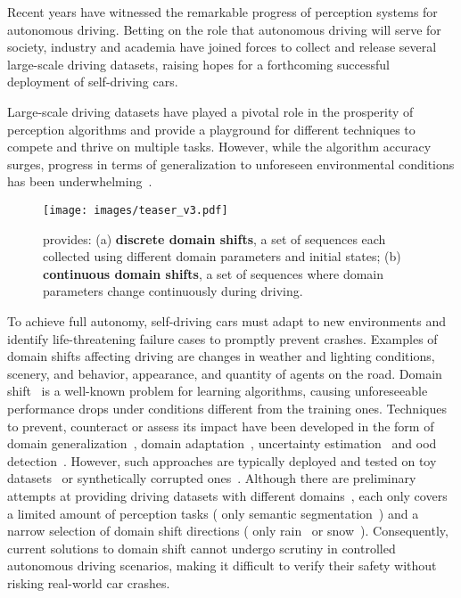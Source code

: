 Recent years have witnessed the remarkable progress of perception systems for autonomous driving.
Betting on the role that autonomous driving will serve for society,
industry
and academia have joined forces to collect and release several large-scale driving datasets, raising hopes for a forthcoming successful deployment of self-driving cars.

Large-scale driving datasets have 
played a pivotal role in the prosperity of perception algorithms and provide a playground for different techniques to compete and thrive on multiple tasks.
However, while the algorithm accuracy surges, progress in terms of generalization to unforeseen environmental conditions has been underwhelming~\cite{dai2018dark,michaelis2019benchmarking}.

\begin{figure}[!t]
    \centering
    \texttt{[image: images/teaser\_v3.pdf]}
    \caption{\thedataset{} provides: (a) \textbf{discrete domain shifts}, a set of sequences each collected using different domain parameters and initial states;
    (b) \textbf{continuous domain shifts}, a set of sequences where domain parameters change continuously during driving.
    \label{fig:teaser}}
\end{figure}
To achieve full autonomy, self-driving cars must adapt to new environments and identify life-threatening failure cases to promptly prevent crashes.
Examples of domain shifts affecting driving are changes in weather and lighting conditions, scenery, and behavior, appearance, and quantity of agents
on the road.
Domain shift~\cite{ben2010theory} is a well-known problem for learning algorithms, causing unforeseeable performance drops under conditions different from the training ones. 
Techniques to prevent, counteract or assess its impact have been developed in the form of domain generalization~\cite{khosla2012undoing,muandet2013domain,tobin2017domain,volpi2018generalizing}, domain adaptation~\cite{wang2018deep,ganin2015unsupervised,long2015learning,tzeng2017adversarial}, uncertainty estimation~\cite{gal2016dropout,lakshminarayanan2017simple,postels2019sampling,loquercio2020general} and \ac{ood} detection~\cite{yang2021generalized,ruff2021unifying,hendrycks2016baseline,postels2020hidden}.
However, such approaches are typically deployed and tested on toy datasets~\cite{saenko2010adapting,venkateswara2017deep,li2017deeper} or synthetically corrupted ones~\cite{hendrycks2019robustness}. 
Although there are preliminary attempts at providing driving datasets with different domains~\cite{bdd100k,caesar2020nuscenes,dai2018dark,pitropov2021canadian,sakaridis2018semantic,tung2017raincouver,sakaridis2021acdc,ros2016synthia}, each only covers a limited amount of perception tasks (\eg{} only semantic segmentation~\cite{sakaridis2018semantic,sakaridis2021acdc}) and a narrow selection of domain shift directions (\eg{} only rain~\cite{tung2017raincouver} or snow~\cite{pitropov2021canadian}). 
Consequently, current solutions to domain shift cannot undergo scrutiny in controlled autonomous driving scenarios, making it difficult to verify their safety without risking real-world car crashes.

